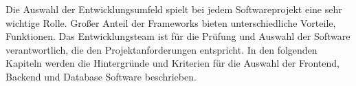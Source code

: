 \begin{spacing}{1}  
\end{spacing}
Die Auswahl der Entwicklungsumfeld spielt bei jedem Softwareprojekt eine sehr
wichtige Rolle. Großer Anteil der Frameworks bieten unterschiedliche Vorteile,
Funktionen. 
Das Entwicklungsteam ist für die Prüfung und Auswahl der Software verantwortlich,
die den Projektanforderungen entspricht. In den folgenden Kapiteln werden
die Hintergründe und Kriterien für die Auswahl der Frontend, Backend und Database Software
beschrieben. 